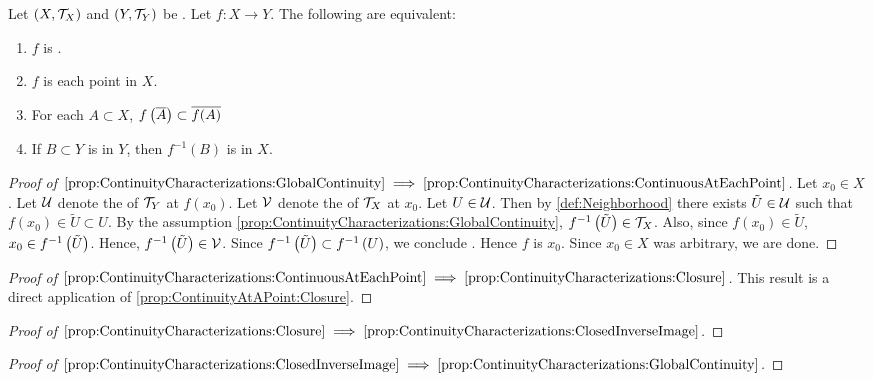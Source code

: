 \begin{prop}
\label{prop:ContinuityCharacterization}
Let $(X, \mathcal{T}_X)$ and 
$(Y, \mathcal{T}_Y)$ 
be 
\TopologicalSpaces.
Let $f:X \to Y$. 
The following are equivalent:
\begin{enumerate}[label=(\roman*), ref={\ref{prop:ContinuityCharacterization}.~\roman*}]
\item
\label{prop:ContinuityCharacterizations:GlobalContinuity}
$f$ is \ContinuousFunction.
\item 
\label{prop:ContinuityCharacterizations:ContinuousAtEachPoint}
$f$ is \ContinuousAt each point in $X$. 
\item 
\label{prop:ContinuityCharacterizations:Closure}
For each $A \subset X$, 
$f\left( \overline{A}\right) \subset \overline{f(A)}$
\item
\label{prop:ContinuityCharacterizations:ClosedInverseImage}
If $B \subset Y$ is 
\SetClosed in $Y$, 
then 
$f^{-1}(B)$ is \SetClosed in $X$. 
\end{enumerate}
\begin{proof}[Proof of $\ref{prop:ContinuityCharacterizations:GlobalContinuity} \implies \ref{prop:ContinuityCharacterizations:ContinuousAtEachPoint}$]

Let $x_0 \in X$. 
Let $\mathcal{U}$ denote the \NeighborhoodFilter of $\mathcal{T}_Y$ at $f(x_0)$. 
Let $\mathcal{V}$ denote the \NeighborhoodFilter of $\mathcal{T}_X$ at $x_0$.
Let $U \in \mathcal{U}$. 
Then by 
\ref{def:Neighborhood}
there exists \SetOpen $\tilde{U} \in \mathcal{U}$ such that $f(x_0) \in \tilde{U} \subset U$. 
By the assumption 
\ref{prop:ContinuityCharacterizations:GlobalContinuity}, 
$f^{-1}\left( \tilde{U}\right) \in \mathcal{T}_X$. 
Also, since $f(x_0) \in \tilde{U}$, $x_0 \in f^{-1}\left( \tilde{U}\right)$.
Hence, $f^{-1}\left( \tilde{U}\right) \in \mathcal{V}$. 
Since $f^{-1}\left( \tilde{U}\right) \subset f^{-1}\left( U\right)$, 
we conclude 
.
Hence $f$ is \ContinuousAt $x_0$. 
Since $x_0 \in X$ was arbitrary, we are done. 
\end{proof}
\begin{proof}[Proof of $\ref{prop:ContinuityCharacterizations:ContinuousAtEachPoint} \implies \ref{prop:ContinuityCharacterizations:Closure}$]

This result is a direct application of 
\ref{prop:ContinuityAtAPoint:Closure}.
\end{proof}
\begin{proof}[Proof of $\ref{prop:ContinuityCharacterizations:Closure} \implies \ref{prop:ContinuityCharacterizations:ClosedInverseImage}$]
\end{proof}
\begin{proof}[Proof of $\ref{prop:ContinuityCharacterizations:ClosedInverseImage} \implies \ref{prop:ContinuityCharacterizations:GlobalContinuity}$]
\end{proof}
\end{prop}
